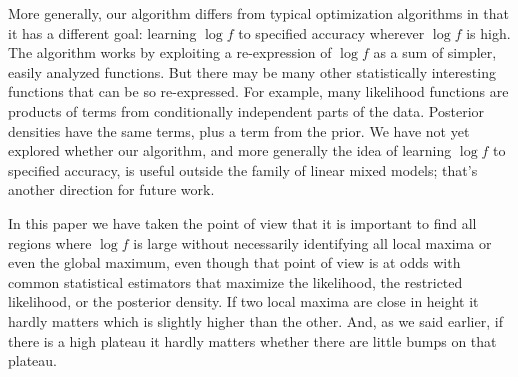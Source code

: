 \documentclass{report}
\newcommand{\RL}{f}
\newcommand{\logRL}{\log\RL}
\begin{document}
More generally, our algorithm differs from typical optimization algorithms in that it has a different goal: learning $\logRL$ to specified accuracy wherever $\logRL$ is high.  The algorithm works by exploiting a re-expression of $\logRL$ as a sum of simpler, easily analyzed functions.  But there may be many other statistically interesting functions that can be so re-expressed.  For example, many likelihood functions are products of terms from conditionally independent parts of the data.  Posterior densities have the same terms, plus a term from the prior.  We have not yet explored whether our algorithm, and more generally the idea of learning $\logRL$ to specified accuracy, is useful outside the family of linear mixed models; that's another direction for future work.

In this paper we have taken the point of view that it is important to find all regions where $\log f$ is large without necessarily identifying all local maxima or even the global maximum, even though that point of view is at odds with common statistical estimators that maximize the likelihood, the restricted likelihood, or the posterior density.  If two local maxima are close in height it hardly matters which is slightly higher than the other.  And, as we said earlier, if there is a high plateau it hardly matters whether there are little bumps on that plateau.

\appendix
\end{document}
